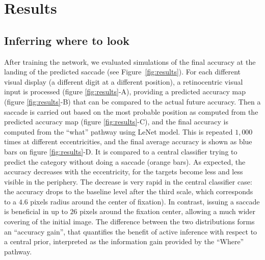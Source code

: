 \section{Results}
\label{sec:results}
\subsection{Inferring where to look}
After training the network, we evaluated simulations of the final accuracy at the landing of the predicted saccade (see Figure~\ref{fig:results}). For each different visual display (a different digit at a different position), a retinocentric visual input is processed (figure \ref{fig:results}-A), providing a predicted accuracy map (figure \ref{fig:results}-B) that can be compared to the actual future accuracy. Then a saccade is carried out based on the most probable position as computed from the predicted accuracy map (figure \ref{fig:results}-C), and the final accuracy is computed from the ``what'' pathway using LeNet model. This is repeated $1,000$ times at different eccentricities, and the final average accuracy is shown as blue bars on figure \ref{fig:results}-D. It is compared to a central classifier trying to predict the category without doing a saccade (orange bars). As expected, the accuracy decreases with the eccentricity, for the targets become less and less visible in the periphery. The decrease is very rapid in the central classifier case: the accuracy drops to the baseline level %
after the third scale, which corresponds to a $4.6$ pixels radius around the center of fixation). In contrast, issuing a saccade is beneficial in up to $26$ pixels around the fixation center, allowing a much wider covering of the initial image. The difference between the two distributions forms an ``accuracy gain'', that quantifies the benefit of active inference with respect to a central prior, interpreted as the information gain provided by the ``Where'' pathway.
